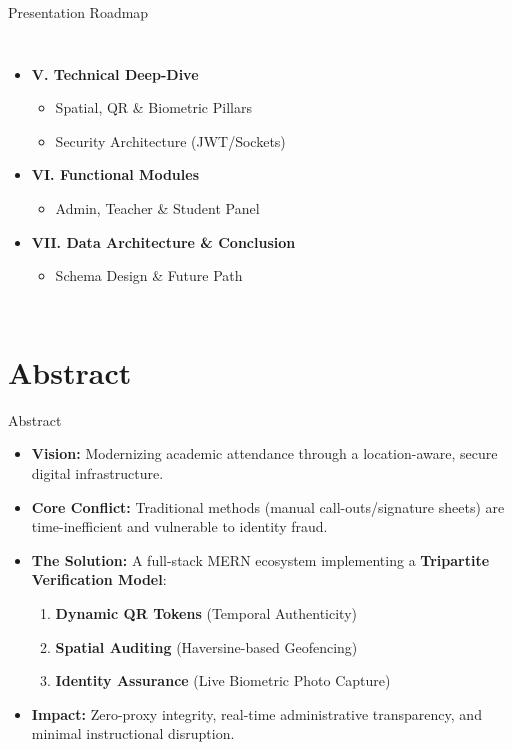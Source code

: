 \documentclass[10pt, aspectratio=169]{beamer}
\begin{document}
\begin{frame}{Presentation Roadmap}
\begin{columns}[c]
        \begin{itemize}
            \item \textbf{V. Technical Deep-Dive}
            \begin{itemize}
                \item Spatial, QR \& Biometric Pillars
                \item Security Architecture (JWT/Sockets)
            \end{itemize}
            \item \textbf{VI. Functional Modules}
            \begin{itemize}
                \item Admin, Teacher \& Student Panel
            \end{itemize}
            \item \textbf{VII. Data Architecture \& Conclusion}
            \begin{itemize}
                \item Schema Design \& Future Path
            \end{itemize}
        \end{itemize}
    \end{columns}
\end{frame}

\section{Abstract}
\begin{frame}{Abstract}
    \begin{itemize}
        \item \textbf{Vision:} Modernizing academic attendance through a location-aware, secure digital infrastructure.
        \item \textbf{Core Conflict:} Traditional methods (manual call-outs/signature sheets) are time-inefficient and vulnerable to identity fraud.
        \item \textbf{The Solution:} A full-stack MERN ecosystem implementing a \textbf{Tripartite Verification Model}:
        \begin{enumerate}
            \item \textbf{Dynamic QR Tokens} (Temporal Authenticity)
            \item \textbf{Spatial Auditing} (Haversine-based Geofencing)
            \item \textbf{Identity Assurance} (Live Biometric Photo Capture)
        \end{enumerate}
        \item \textbf{Impact:} Zero-proxy integrity, real-time administrative transparency, and minimal instructional disruption.
    \end{itemize}
\end{frame}
\end{document}
